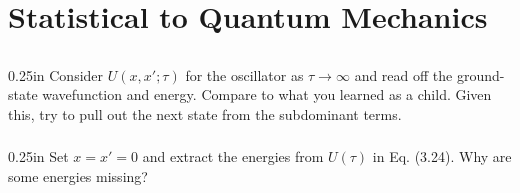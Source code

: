 \documentclass[paper=a4, fontsize=11pt]{scrartcl}
\numberwithin{equation}{section}
\numberwithin{figure}{section}
\numberwithin{table}{section}
\newenvironment{problem}{\subsection{}}{}
\newenvironment{subproblem}{\subsubsection{}\begin{adjustwidth}{0.25in}{}\vspace{-0.28in}}{\end{adjustwidth}}
\begin{document}
\section{Statistical to Quantum Mechanics}

\vskip 0.3in

\begin{problem}
	\begin{subproblem}
		Consider $U(x,x'; \tau)$ for the oscillator as $\tau\to\infty$ and read off the ground-state wavefunction and energy. Compare to what you learned as a child. Given this, try to pull out the next state from the subdominant terms.
	\end{subproblem}
	\begin{subproblem}
		Set $x=x'=0$ and extract the energies from $U(\tau)$ in Eq. (3.24). Why are some energies missing?
	\end{subproblem}
\end{problem}

\vskip 0.15in
\end{document}
